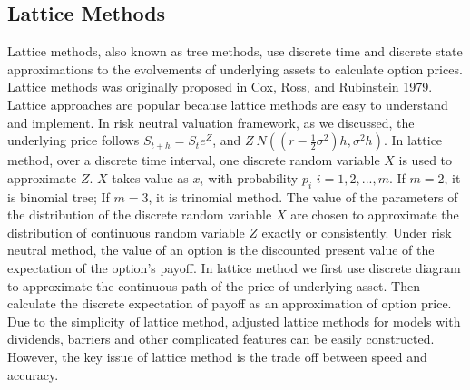 \documentclass[11pt]{book}
\begin{document}
\subsection{Lattice Methods}
Lattice methods, also known as tree methods, use discrete time and discrete state approximations to the evolvements of underlying assets to calculate option prices. Lattice methods was originally proposed in
Cox, Ross, and Rubinstein 1979. Lattice approaches are popular because lattice methods are easy to understand and implement. In risk neutral valuation framework, as we discussed, the underlying price follows $S_{t+h} = S_t e^{Z}$, and $Z ~ N((r-\frac{1}{2} \sigma ^2)h,\sigma ^2 h)$. In lattice method, over a discrete time interval, one discrete random variable $X$ is used to approximate $Z$. $X$ takes value as $x_i$ with probability $p_i$ $i=1,2,...,m$. If $m=2$, it is binomial tree; If $m=3$, it is trinomial method. The value of the parameters of the distribution of the discrete random variable $X$ are chosen to approximate the distribution of continuous random variable $Z$ exactly or consistently. Under risk neutral method, the value of an option is the discounted present value of the expectation of the option's payoff. In lattice method we first use discrete diagram to approximate the continuous path of the price of underlying asset. Then calculate the discrete expectation of payoff as an approximation of option price. Due to the simplicity of lattice method, adjusted lattice methods for models with dividends, barriers and other complicated features can be easily constructed. However, the key issue of lattice method is the trade off between speed and accuracy. 




\end{document}
